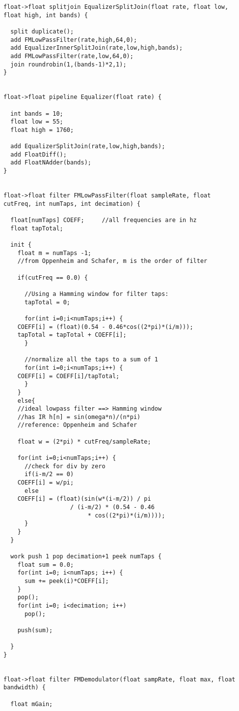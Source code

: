 \begin{scriptsize}
\begin{verbatim}
float->float splitjoin EqualizerSplitJoin(float rate, float low,
float high, int bands) {

  split duplicate();
  add FMLowPassFilter(rate,high,64,0);
  add EqualizerInnerSplitJoin(rate,low,high,bands);
  add FMLowPassFilter(rate,low,64,0);
  join roundrobin(1,(bands-1)*2,1);
}


float->float pipeline Equalizer(float rate) {

  int bands = 10;
  float low = 55;
  float high = 1760;

  add EqualizerSplitJoin(rate,low,high,bands);
  add FloatDiff();
  add FloatNAdder(bands);
}


float->float filter FMLowPassFilter(float sampleRate, float
cutFreq, int numTaps, int decimation) {

  float[numTaps] COEFF;     //all frequencies are in hz
  float tapTotal;

  init {
    float m = numTaps -1;
    //from Oppenheim and Schafer, m is the order of filter

    if(cutFreq == 0.0) {

      //Using a Hamming window for filter taps:
      tapTotal = 0;

      for(int i=0;i<numTaps;i++) {
    COEFF[i] = (float)(0.54 - 0.46*cos((2*pi)*(i/m)));
    tapTotal = tapTotal + COEFF[i];
      }

      //normalize all the taps to a sum of 1
      for(int i=0;i<numTaps;i++) {
    COEFF[i] = COEFF[i]/tapTotal;
      }
    }
    else{
    //ideal lowpass filter ==> Hamming window
    //has IR h[n] = sin(omega*n)/(n*pi)
    //reference: Oppenheim and Schafer

    float w = (2*pi) * cutFreq/sampleRate;

    for(int i=0;i<numTaps;i++) {
      //check for div by zero
      if(i-m/2 == 0)
    COEFF[i] = w/pi;
      else
    COEFF[i] = (float)(sin(w*(i-m/2)) / pi
                   / (i-m/2) * (0.54 - 0.46
                        * cos((2*pi)*(i/m))));
      }
    }
  }

  work push 1 pop decimation+1 peek numTaps {
    float sum = 0.0;
    for(int i=0; i<numTaps; i++) {
      sum += peek(i)*COEFF[i];
    }
    pop();
    for(int i=0; i<decimation; i++)
      pop();

    push(sum);

  }
}


float->float filter FMDemodulator(float sampRate, float max, float
bandwidth) {

  float mGain;


\end{verbatim}
\end{scriptsize}
